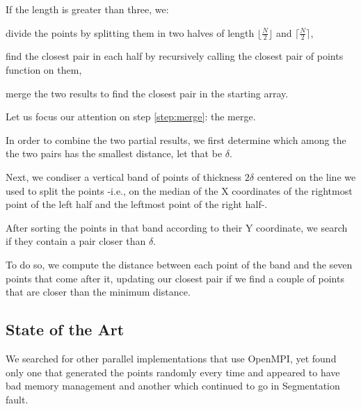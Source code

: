 If the length is greater than three, we:
\begin{inlinelist}
    \item divide the points by splitting them in two halves of length $\lfloor \frac{N}{2} \rfloor$ and $\lceil \frac{N}{2} \rceil$,
    \item find the closest pair in each half by recursively calling the closest pair of points function on them,
    \item merge the two results to find the closest pair in the starting array. \label{step:merge}
\end{inlinelist}

Let us focus our attention on step \ref{step:merge}: the merge.

In order to combine the two partial results, we first determine which among the the two pairs has the smallest distance, let that be $\delta$.

Next, we condiser a vertical band of points of thickness $2\delta$ centered on the line we used to split the points -i.e., on the median of the X coordinates of the rightmost point of the left half and the leftmost point of the right half-.

After sorting the points in that band according to their Y coordinate, we search if they contain a pair closer than $\delta$.

To do so, we compute the distance between each point of the band and the seven points that come after it,
updating our closest pair if we find a couple of points that are closer than the minimum distance\cite{lingqi}.


\subsection{State of the Art}
We searched for other parallel implementations that use OpenMPI, yet found only one \cite{gh1} that generated the points randomly every time and appeared to have bad memory management and another \cite{gh2_fortran} which continued to go in Segmentation fault.
